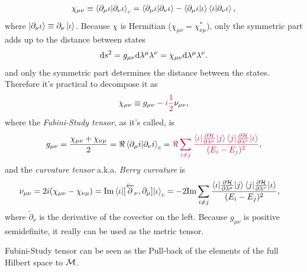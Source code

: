 \begin{equation}
    \chi_{\mu\nu}\equiv \braket{\partial_\mu \iota|\partial_\nu \iota}_c = \braket{\partial_\mu \iota|\partial_\nu \iota} - \braket{\partial_\mu \iota|\iota}\braket{\iota|\partial_\nu \iota},
\end{equation}
where $\ket{\partial_\nu \iota}\equiv\partial_\nu \ket{ \iota}$. Because $\chi$ is Hermitian ($\chi_{\mu\nu}=\chi^*_{\nu\mu}$), only the symmetric part adds up to the distance between states 
\begin{equation}
    \mathrm{d} s^2= g_{\mu\nu}\mathrm{d} \lambda^\mu \lambda^\nu= \chi_{\mu\nu}\mathrm{d} \lambda^\mu \lambda^\nu.
\end{equation}
 and only the symmetric part determines the distance between the states. Therefore it's practical to decompose it as
\begin{equation}
    \chi_{\mu\nu} \equiv g_{\mu\nu} - \textcolor{purple}{i\frac{1}{2}} \nu_{\mu\nu},
\end{equation}
where the \emph{Fubini-Study tensor}, as it's called, is
\begin{equation}
    g_{\mu\nu} = \frac{\chi_{\mu\nu}+\chi_{\nu\mu}}{2} = \Re\braket{\partial_\mu i|\partial_\nu i}_c = \textcolor{purple}{\Re \sum_{i\neq j}\frac{\braket{\iota|\frac{\partial \mathcal{H}}{\partial \lambda^\mu}|j}\braket{j|\frac{\partial \mathcal{H}}{\partial \lambda^\nu}|\iota}}{(E_i-E_j)^2}},
    \label{eq:geom.tensorREdefinition}
\end{equation}
and the \emph{curvature tensor} a.k.a. \emph{Berry curvature} is
\begin{equation}
    \begin{split}
        \nu_{\mu\nu} = 2 i(\chi_{\mu\nu}-\chi_{\nu\mu})&= \textrm{Im}\braket{\iota|[\overleftarrow{\partial}_\nu,\partial_\mu]|\iota}_c = -2 \textrm{Im} \sum_{i\neq j}\frac{\braket{\iota|\frac{\partial \mathcal{H}}{\partial \lambda^\mu}|j}\braket{j|\frac{\partial \mathcal{H}}{\partial \lambda^\nu}|\iota}}{(E_i-E_j)^2},
    \end{split}
\end{equation}
where $\overleftarrow{\partial}_\nu$ is the derivative of the covector on the left.
Because $g_{\mu\nu}$ is positive semidefinite, it really can be used as the metric tensor.

Fubini-Study tensor can be seen as the Pull-back of the elements of the full Hilbert space to $\mathcal{M}$. 


